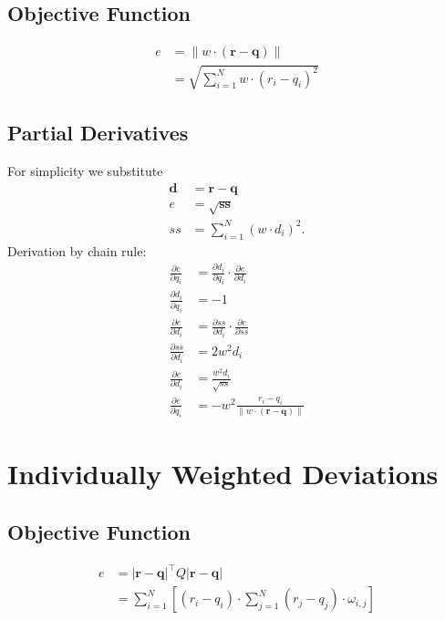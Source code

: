 \subsection{Objective Function}
\begin{align}
e &= \lVert w \cdot (\mathbf{r} - \mathbf{q}) \rVert \\
&= \sqrt{\sum_{i=1}^N w \cdot (r_i - q_i)^2}
\end{align}

\subsection{Partial Derivatives}
For simplicity we substitute
\begin{align}
\mathbf{d} &= \mathbf{r} - \mathbf{q} \\
e &= \sqrt{\mathbf{ss}} \\
ss &= \sum_{i=1}^N (w \cdot d_i)^2 .
\end{align}
%
Derivation by chain rule:
\begin{align}
\frac{\partial e}{\partial q_i} &= \frac{\partial d_i}{\partial q_i} \cdot \frac{\partial e}{\partial d_i} \\
\frac{\partial d_i}{\partial q_i} &= -1 \nonumber\\
\frac{\partial e}{\partial d_i} &= \frac{\partial ss}{\partial d_i} \cdot \frac{\partial e}{\partial ss} \nonumber\\
\frac{\partial ss}{\partial d_i} &= 2 w^2 d_i \nonumber\\
\frac{\partial e}{\partial d_i} &= \frac{w^2 d_i}{\sqrt{ss}} \nonumber\\
\frac{\partial e}{\partial q_i} &= -w^2 \frac{r_i - q_i}{\lVert w \cdot (\mathbf{r} - \mathbf{q}) \rVert}
\end{align}


\section{Individually Weighted Deviations}

\subsection{Objective Function}
\begin{align}
e &= \lvert \mathbf{r} - \mathbf{q} \rvert^\top Q \lvert \mathbf{r} - \mathbf{q} \rvert\\
&= \sum_{i=1}^N \left[ (r_i-q_i) \cdot \sum_{j=1}^N (r_j-q_j) \cdot \omega_{i,j} \right]
\end{align}

